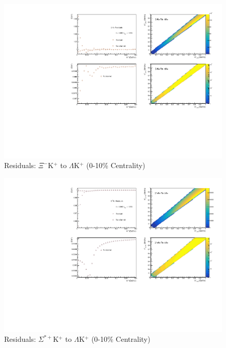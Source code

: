 \documentclass[/home/jesse/Analysis/FemtoAnalysis/AnalysisNotes/AnalysisNoteJBuxton.tex]{subfiles}
\begin{document}
\begin{figure}[h]
  \centering
  \includegraphics[width=\textwidth]{9_AdditionalFigures/Figures/Residuals/LamKchP/Residuals_LamKchP_0010_XiKchP_MomResCrctn_NonFlatBgdCrctn_10Res_PrimMaxDecay4fm_UsingXiDataAndCoulombOnly.pdf}
  \caption[Residuals: $\Xi^{-}$K$^{+}$ to $\Lambda$K$^{+}$ (0-10\% Centrality)]{Residuals: $\Xi^{-}$K$^{+}$ to $\Lambda$K$^{+}$ (0-10\% Centrality)}
  \label{fig:Res_LamKchP_0010_XiCKchP}
\end{figure}


\begin{figure}[h]
  \centering
  \includegraphics[width=\textwidth]{9_AdditionalFigures/Figures/Residuals/LamKchP/Residuals_LamKchP_0010_SigStPKchP_MomResCrctn_NonFlatBgdCrctn_10Res_PrimMaxDecay4fm_UsingXiDataAndCoulombOnly.pdf}
  \caption[Residuals: $\Sigma^{*+}$K$^{+}$ to $\Lambda$K$^{+}$ (0-10\% Centrality)]{Residuals: $\Sigma^{*+}$K$^{+}$ to $\Lambda$K$^{+}$ (0-10\% Centrality)}
  \label{fig:Res_LamKchP_0010_SigStPKchP}
\end{figure}
\end{document}
